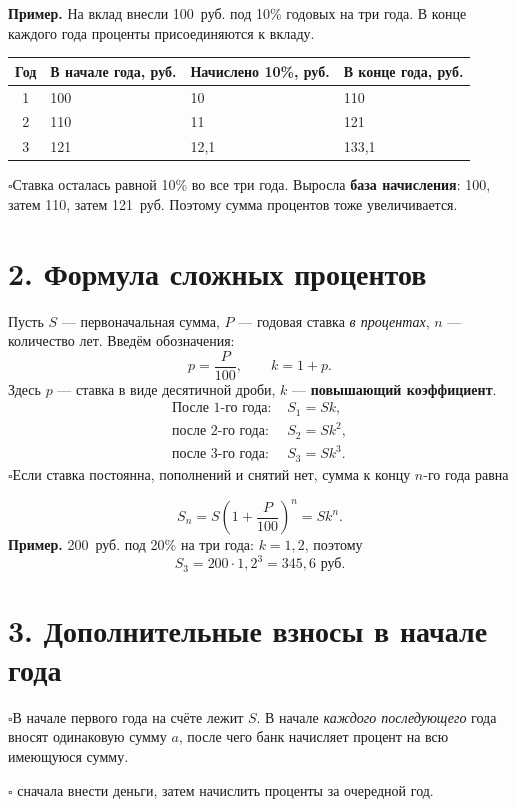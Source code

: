 \documentclass[a4paper,12pt]{article}
\newcommand{\checkitem}[1]{\noindent\(\square\)\enspace #1\par}
\newcommand{\keyterm}[1]{{\color{darkaccent}\textbf{#1}}}
\newcommand{\smallrule}{\par\vspace{.15em}{\color{lightline}\rule{\linewidth}{.35pt}}\vspace{.15em}}
\begin{document}
\textbf{Пример.} На вклад внесли 100~руб. под 10\% годовых на три года. В конце каждого года проценты присоединяются к вкладу.
\begin{center}
\renewcommand{\arraystretch}{1.33}
\begin{tabularx}{\linewidth}{@{}cXXX@{}}
\toprule
\textbf{Год} & \textbf{В начале года, руб.} & \textbf{Начислено 10\%, руб.} & \textbf{В конце года, руб.} \\
\midrule
1 & 100 & 10 & 110 \\
2 & 110 & 11 & 121 \\
3 & 121 & 12{,}1 & 133{,}1 \\
\bottomrule
\end{tabularx}
\end{center}
\checkitem{Ставка осталась равной 10\% во все три года. Выросла \keyterm{база начисления}: 100, затем 110, затем 121~руб. Поэтому сумма процентов тоже увеличивается.}

\smallrule
\section*{2. Формула сложных процентов}
Пусть \(S\) --- первоначальная сумма, \(P\) --- годовая ставка \emph{в процентах}, \(n\) --- количество лет. Введём обозначения:
\[
\boxed{p=\frac{P}{100}},\qquad \boxed{k=1+p}.
\]
Здесь \(p\) --- ставка в виде десятичной дроби, \(k\) --- \keyterm{повышающий коэффициент}.
\[
\begin{aligned}
\text{После 1-го года: }&S_1=Sk,\\
\text{после 2-го года: }&S_2=Sk^2,\\
\text{после 3-го года: }&S_3=Sk^3.
\end{aligned}
\]
\checkitem{Если ставка постоянна, пополнений и снятий нет, сумма к концу \(n\)-го года равна}
\[
\boxed{S_n=S\left(1+\frac{P}{100}\right)^n=Sk^n.}
\]
\textbf{Пример.} 200~руб. под 20\% на три года: \(k=1{,}2\), поэтому
\[
S_3=200\cdot1{,}2^3=\boxed{345{,}6\text{ руб.}}
\]

\clearpage
\section*{3. Дополнительные взносы в начале года}
\checkitem{В начале первого года на счёте лежит \(S\). В начале \emph{каждого последующего} года вносят одинаковую сумму \(a\), после чего банк начисляет процент на всю имеющуюся сумму.}
\checkitem{\keyterm{Порядок важен:} сначала внести деньги, затем начислить проценты за очередной год.}
\end{document}
